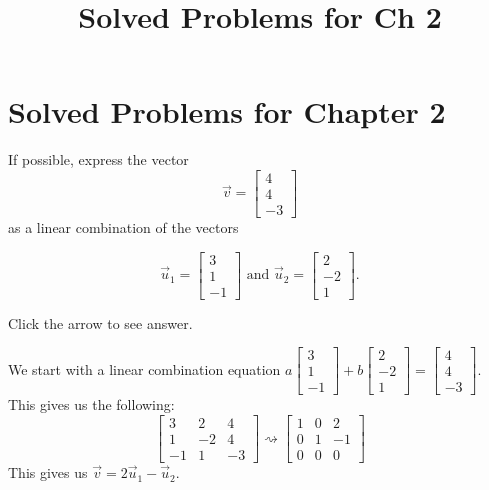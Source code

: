 \documentclass{ximera}
\title{Solved Problems for Ch 2} \license{CC BY-NC-SA 4.0}
\begin{document}
\begin{abstract}
\end{abstract}
\maketitle

\section*{Solved Problems for Chapter 2}

\begin{problem}\label{prb:3.3}
If possible, express the vector
\begin{equation*}
\vec{v}= 
\begin{bmatrix}
4 \\
4 \\
-3
\end{bmatrix}
\end{equation*}
as a linear combination of the vectors

\begin{equation*}
\vec{u}_1 = 
\begin{bmatrix}
3 \\
1 \\
-1
\end{bmatrix}
\mbox{ and  }
\vec{u}_2 =
\begin{bmatrix}
2 \\
-2\\
1
\end{bmatrix}.
\end{equation*}

Click the arrow to see answer.
\begin{expandable}
    We start with a linear combination equation $a\begin{bmatrix}3\\1\\-1\end{bmatrix}+b\begin{bmatrix}2\\-2\\1\end{bmatrix}=\begin{bmatrix}4\\4\\-3\end{bmatrix}$.  This gives us the following:
    $$\left[
\begin{array}{rr|r}
3 & 2 & 4 \\
1 & -2 & 4\\
-1 & 1 & -3
\end{array}
\right] \rightsquigarrow \left[
\begin{array}{rr|r}1& 0& 2\\
 0& 1 &-1\\
 0& 0& 0\end{array}
\right]$$
This gives us $\vec{v}=2\vec{u}_1 -\vec{u}_2$.
\end{expandable}
\end{problem}
\end{document}
